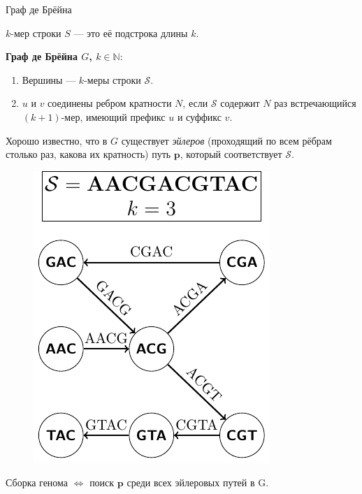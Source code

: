 \documentclass[unicode, notheorems]{beamer}
\begin{document}
\begin{frame}[fragile]{Граф де Брёйна}
	\begin{block}{}
		$k$-мер строки $S$ --- это её подстрока длины $k$.
	\end{block}
	\medskip
    \begin{minipage}{0.6\textwidth}
        \textbf{Граф де Брёйна $G$, $k \in \mathbb{N}$}:
        \begin{enumerate}
            \item Вершины --- $k$-меры строки $\mathcal{S}$.
            \item $u$ и $v$ соединены ребром кратности $N$, если $\mathcal{S}$ содержит $N$ раз встречающийся $(k+1)$-мер, имеющий префикс $u$ и суффикс $v$.
        \end{enumerate}
		
        Хорошо известно, что в $G$ существует \textit{эйлеров} (проходящий по всем рёбрам столько раз, какова их кратность) путь $\mathbf{p}$, который соответствует $\mathcal{S}$.
    \end{minipage}%
    \begin{minipage}{0.4\textwidth}
    	\begin{figure}
	        \centering
    	    \includegraphics[width=0.9\linewidth]{fig/dBg}
        \end{figure}
    \end{minipage}
	
	\bigskip
    Сборка генома $\iff$ поиск $\mathbf{p}$ среди всех эйлеровых путей в G.
\end{frame}
\end{document}
